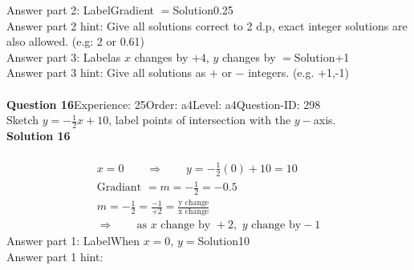 \documentclass{article}
\begin{document}
Answer part 2: \hspace{10pt}Label\hspace{10pt}Gradient $=$\hspace{10pt}Solution\hspace{10pt}0.25\\
Answer part 2 hint: \hspace{15pt}Give all solutions correct to 2 d.p, exact integer solutions are also allowed. (e.g: 2 or 0.61)\\
Answer part 3: \hspace{10pt}Label\hspace{10pt}as $x$ changes by $+4$, $y$ changes by $=$\hspace{10pt}Solution\hspace{10pt}+1\\
Answer part 3 hint: \hspace{15pt}Give all solutions as $+$ or $-$ integers. (e.g. +1,-1)\\
\\[4pt]
\noindent\textbf{Question 16}\hspace{20pt}Experience: 25\hspace{20pt}Order: a4\hspace{20pt}Level: a4\hspace{20pt}Question-ID: 298\\[2pt]
Sketch $y=-\displaystyle\frac{1}{2}x+10$, label points of intersection with the $y-$axis.\\[4pt]
\noindent\textbf{Solution 16}\\[2pt]
\\[-35pt]\begin{align*}
&x=0\qquad\Rightarrow\qquad y=-\displaystyle\frac{1}{2}(0)+10=10&\\[2pt]
&\text{Gradiant}\,\,=m=-\displaystyle\frac{1}{2}=-0.5&\\[2pt]
&m=-\displaystyle\frac{1}{2}=\displaystyle\frac{-1}{+2}=\displaystyle\frac{\text{y change}}{\text{x change}}&\\[2pt]
& \Rightarrow\qquad \text{as}\,\, x \,\,\text{change by } +2,\,\, y\,\, \text{change by} -1 &
\end{align*}
Answer part 1: \hspace{10pt}Label\hspace{10pt}When $x=0$, $y=$\hspace{10pt}Solution\hspace{10pt}10\\
Answer part 1 hint: \hspace{15pt}\\
\end{document}
